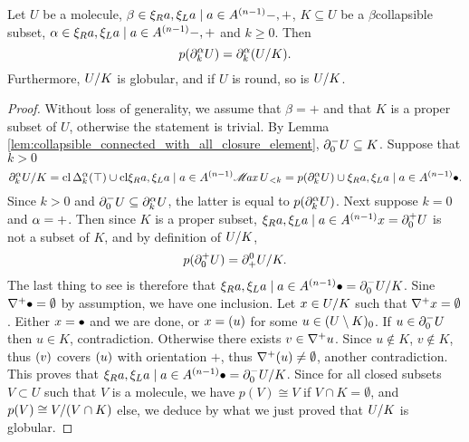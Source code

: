 \begin{lem} \label{lem:collapsible_mapcoll_preserve_boundaries}
    Let \( U \) be a molecule, \( \beta \in \set{-, +} \), \( K \subseteq U \) be a \( \beta \)\nbd collapsible subset, \( \a \in \set{-, +} \) and \( k \geq 0 \).
    Then
    \begin{equation*}
        \mapcoll (\bd{k}{\a} U) = \bd{k}{\a} (\coll{K}{U}).
    \end{equation*}
    Furthermore, \( \coll{K}{U} \) is globular, and if \( U \) is round, so is \( \coll{K}{U} \).
\end{lem}
\begin{proof}
    Without loss of generality, we assume that \( \beta = + \) and that \( K \) is a proper subset of \( U \), otherwise the statement is trivial.
    By Lemma \ref{lem:collapsible_connected_with_all_closure_element}, \( \bd{0}{-} U \subseteq K \).
    Suppose that \( k > 0 \)
    \begin{equation*}
        \bd{k}{\a} \coll{K}{U} = \clos \faces{k}{\a} \icoll{\top} \cup \gr{< k}{\clset{\maxel U}} = \mapcoll(\bd{k}{\a} U) \cup \set{\zcoll}.
    \end{equation*}
    Since \( k > 0 \) and \( \bd{0}{-} U \subseteq \bd{k}{\a} U \), the latter is equal to \( \mapcoll(\bd{k}{\a} U) \).
    Next suppose \( k = 0 \) and \( \a = + \).
    Then since \( K \) is a proper subset, \( \set{x} = \bd{0}{+} U \) is not a subset of \( K \), and by definition of \( \coll{K}{U} \), 
    \begin{equation*}
        \mapcoll (\bd{0}{+} U) = \bd{+}{0} \coll{K}{U}.
    \end{equation*}
    The last thing to see is therefore that \( \set{\zcoll} = \bd{0}{-} \coll{K}{U} \).
    Sine \( \cofaces{}{+} \zcoll = \emptyset \) by assumption, we have one inclusion.
    Let \( x \in \coll{K}{U} \) such that \( \cofaces{}{+} x = \emptyset \).
    Either \( x = \zcoll \) and we are done, or \( x = \icoll{u} \) for some \( u \in \gr{0}{(U \setminus K)} \).
    If \( u \in \bd{0}{-} U \) then \( u \in K \), contradiction.
    Otherwise there exists \( v \in \cofaces{}{+} u \).
    Since \( u \notin K \), \( v \notin K \), thus \( \icoll{v} \) covers \( \icoll{u} \) with orientation \( + \), thus \( \cofaces{}{+} \icoll{u} \neq \emptyset \), another contradiction.
    This proves that \( \set{\zcoll} = \bd{0}{-} \coll{K}{U} \).
    Since for all closed subsets \( V \subset U \) such that \( V \) is a molecule, we have \( p(V) \cong V \) if \( V \cap K = \emptyset \), and \( p(V) \cong \coll{(V \cap K)}{V} \) else, we deduce by what we just proved that \( \coll{K}{U} \) is globular.

\end{proof}
